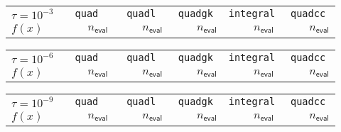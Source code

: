 \documentclass[]{article}
\newcommand{\Checkmark}
    {\ding{51}\xspace}
\newcommand{\XSolid}
    {\ding{53}\xspace}
\begin{document}
\begin{sidewaystable}
    \begin{center}\begin{scriptsize}
    \begin{tabular}{l|c|c|c|c|c|c|c|c|c|c|c|c|c|c|c}
        $\tau=10^{-3}$ & \multicolumn{3}{c|}{\tt quad} & \multicolumn{3}{c|}{\tt quadl} & \multicolumn{3}{c|}{\tt quadgk} & \multicolumn{3}{c|}{\tt integral} & \multicolumn{3}{c}{\tt quadcc} \\
        $f(x)$ & \Checkmark & \XSolid & $n_\mathsf{eval}$ & \Checkmark & \XSolid & $n_\mathsf{eval}$ & \Checkmark & \XSolid & $n_\mathsf{eval}$ & \Checkmark & \XSolid & $n_\mathsf{eval}$ & \Checkmark & \XSolid & $n_\mathsf{eval}$ \\ \hline
            
    \end{tabular}\end{scriptsize}\end{center}

    \begin{center}\begin{scriptsize}\begin{tabular}{l|c|c|c|c|c|c|c|c|c|c|c|c|c|c|c}
        $\tau=10^{-6}$ & \multicolumn{3}{c|}{\tt quad} & \multicolumn{3}{c|}{\tt quadl} & \multicolumn{3}{c|}{\tt quadgk} & \multicolumn{3}{c|}{\tt integral} & \multicolumn{3}{c}{\tt quadcc} \\
        $f(x)$ & \Checkmark & \XSolid & $n_\mathsf{eval}$ & \Checkmark & \XSolid & $n_\mathsf{eval}$ & \Checkmark & \XSolid & $n_\mathsf{eval}$ & \Checkmark & \XSolid & $n_\mathsf{eval}$ & \Checkmark & \XSolid & $n_\mathsf{eval}$ \\ \hline
            
    \end{tabular}\end{scriptsize}\end{center}

    \begin{center}\begin{scriptsize}\begin{tabular}{l|c|c|c|c|c|c|c|c|c|c|c|c|c|c|c}
        $\tau=10^{-9}$ & \multicolumn{3}{c|}{\tt quad} & \multicolumn{3}{c|}{\tt quadl} & \multicolumn{3}{c|}{\tt quadgk} & \multicolumn{3}{c|}{\tt integral} & \multicolumn{3}{c}{\tt quadcc} \\
        $f(x)$ & \Checkmark & \XSolid & $n_\mathsf{eval}$ & \Checkmark & \XSolid & $n_\mathsf{eval}$ & \Checkmark & \XSolid & $n_\mathsf{eval}$ & \Checkmark & \XSolid & $n_\mathsf{eval}$ & \Checkmark & \XSolid & $n_\mathsf{eval}$ \\ \hline
            
    \end{tabular}\end{scriptsize}\end{center}


\end{sidewaystable}
\end{document}
